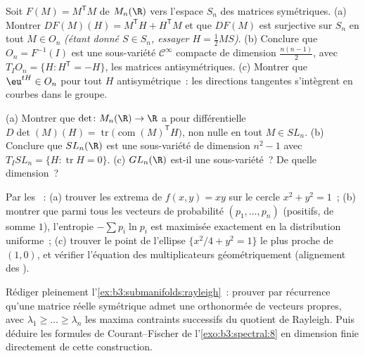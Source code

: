 \begin{exercise}[$\star\star$]\label{exo:b3:submanifolds:5}
Soit $F(M) = M^{\mathsf T}M$ de $M_n(\R)$ vers l'espace
$S_n$ des matrices symétriques.
(a) Montrer $DF(M)(H) = M^{\mathsf T}H + H^{\mathsf T}M$ et
que $DF(M)$ est surjective sur $S_n$ en tout $M \in O_n$
\emph{(étant donné $S \in S_n$, essayer $H = \frac12MS$)}.
(b) Conclure que $O_n = F^{-1}(I)$ est une sous-variété
$\mathcal C^\infty$ compacte de dimension
$\frac{n(n-1)}2$, avec $T_IO_n = \{H : H^{\mathsf T} = -H\}$,
les matrices antisymétriques.
(c) Montrer que $\eu^{tH} \in O_n$ pour tout $H$
antisymétrique~: les directions tangentes s'intègrent en
courbes dans le groupe.
\end{exercise}

\begin{exercise}[$\star\star$]\label{exo:b3:submanifolds:6}
(a) Montrer que $\det \colon M_n(\R) \to \R$ a pour
différentielle $D\det(M)(H) =
\operatorname{tr}\bigl(\operatorname{com}(M)
^{\mathsf T}H\bigr)$, non nulle en tout $M \in SL_n$.
(b) Conclure que $SL_n(\R)$ est une sous-variété de dimension
$n^2 - 1$ avec $T_ISL_n = \{H : \operatorname{tr}H = 0\}$.
(c) $GL_n(\R)$ est-il une sous-variété~? De quelle
dimension~?
\end{exercise}

\begin{exercise}[$\star\star$]\label{exo:b3:submanifolds:7}
Par les ~:
(a) trouver les extrema de $f(x,y) = xy$ sur le cercle $x^2 +
y^2 = 1$~;
(b) montrer que parmi tous les vecteurs de probabilité
$(p_1, \dots, p_n)$ (positifs, de somme $1$), l'entropie
$-\sum p_i\ln p_i$ est maximisée exactement en la
distribution uniforme~;
(c) trouver le point de l'ellipse $\{x^2/4 + y^2 = 1\}$ le
plus proche de $(1, 0)$, et vérifier l'équation des
multiplicateurs géométriquement (alignement des ).
\end{exercise}

\begin{exercise}[$\star\star\star$]\label{exo:b3:submanifolds:8}
Rédiger pleinement l'\cref{ex:b3:submanifolds:rayleigh}~:
prouver par récurrence qu'une matrice réelle symétrique
admet une  orthonormée de vecteurs propres, avec
$\lambda_1 \geq \dots \geq \lambda_n$ les maxima contraints
successifs du quotient de Rayleigh. Puis déduire les formules
de Courant--Fischer de l'\cref{exo:b3:spectral:8} en
dimension finie directement de cette construction.
\end{exercise}


